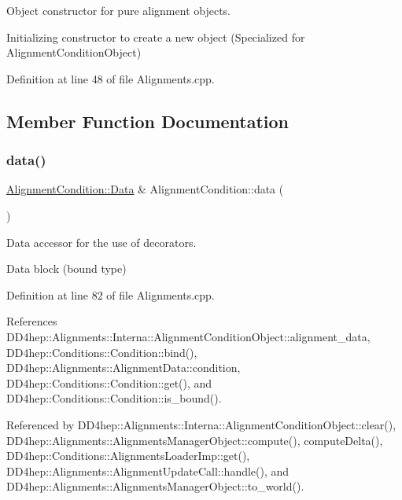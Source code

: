 Object constructor for pure alignment objects. 

Initializing constructor to create a new object (Specialized for Alignment\+Condition\+Object) 

Definition at line 48 of file Alignments.\+cpp.



\subsection{Member Function Documentation}
\hypertarget{class_d_d4hep_1_1_alignments_1_1_alignment_condition_a29cd43941dc85481f8b63ee037041006}{}\label{class_d_d4hep_1_1_alignments_1_1_alignment_condition_a29cd43941dc85481f8b63ee037041006} 
\subsubsection{\texorpdfstring{data()}{data()}\hspace{0.1cm}{\footnotesize\ttfamily [1/2]}}
{\footnotesize\ttfamily \hyperlink{class_d_d4hep_1_1_alignments_1_1_alignment_condition_a6fcd9bd0e9ac67afcf43270cbd9e9983}{Alignment\+Condition\+::\+Data} \& Alignment\+Condition\+::data (\begin{DoxyParamCaption}{ }\end{DoxyParamCaption})}



Data accessor for the use of decorators. 

Data block (bound type) 

Definition at line 82 of file Alignments.\+cpp.



References D\+D4hep\+::\+Alignments\+::\+Interna\+::\+Alignment\+Condition\+Object\+::alignment\+\_\+data, D\+D4hep\+::\+Conditions\+::\+Condition\+::bind(), D\+D4hep\+::\+Alignments\+::\+Alignment\+Data\+::condition, D\+D4hep\+::\+Conditions\+::\+Condition\+::get(), and D\+D4hep\+::\+Conditions\+::\+Condition\+::is\+\_\+bound().



Referenced by D\+D4hep\+::\+Alignments\+::\+Interna\+::\+Alignment\+Condition\+Object\+::clear(), D\+D4hep\+::\+Alignments\+::\+Alignments\+Manager\+Object\+::compute(), compute\+Delta(), D\+D4hep\+::\+Conditions\+::\+Alignments\+Loader\+Imp\+::get(), D\+D4hep\+::\+Alignments\+::\+Alignment\+Update\+Call\+::handle(), and D\+D4hep\+::\+Alignments\+::\+Alignments\+Manager\+Object\+::to\+\_\+world().


